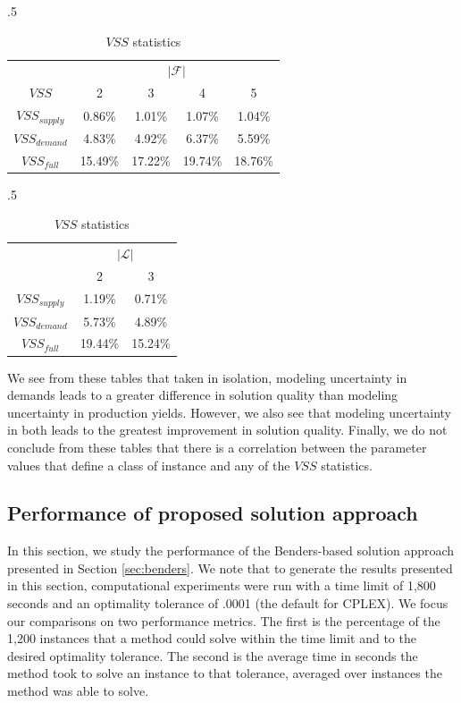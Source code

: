\documentclass[12pt]{article}
\theoremstyle{thmstylethree}%
\begin{document}
\begin{table}[htp]
\begin{subtable}[c]{.5\textwidth}
\small
\centering
\begin{tabular}{|c|c|c|c|c|}
\hline
& \multicolumn{4}{c|}{$\vert \mathcal{F} \vert$}  \\
$VSS$ & 2 & 3 & 4 & 5 \\
\hline
$VSS_{supply}$ & 0.86\% & 1.01\% & 1.07\% & 1.04\% \\
$VSS_{demand}$ & 4.83\% & 4.92\% & 6.37\% & 5.59\% \\
$VSS_{full}$ & 15.49\% & 17.22\% & 19.74\% & 18.76\% \\
\hline
\end{tabular}
\label{tbl:vss_facilities}
\end{subtable}
\begin{subtable}[c]{.5\textwidth}
\center
\small
\begin{tabular}{|c|c|c|}
\hline
& \multicolumn{2}{c|}{$\vert \mathcal{L} \vert$}  \\
 & 2 & 3 \\
 \hline
$VSS_{supply}$ & 1.19\% & 0.71\% \\
$VSS_{demand}$ & 5.73\% & 4.89\% \\
$VSS_{full}$ & 19.44\% & 15.24\% \\
\hline
\end{tabular}
\label{tbl:vss_levels}
\end{subtable}
\caption{$VSS$ statistics}
\end{table}
We see from these tables that taken in isolation, modeling uncertainty in demands leads to a greater difference in solution quality than modeling uncertainty in production yields. However, we also see that modeling uncertainty in both leads to the greatest improvement in solution quality. Finally, we do not conclude from these tables that there is a correlation between the parameter values that define a class of instance and any of the $VSS$ statistics.

\subsection{Performance of proposed solution approach}
\label{subsec:perf_benders}
\noindent
In this section, we study the performance of the Benders-based solution approach presented in Section \ref{sec:benders}. We note that to generate the results presented in this section, computational experiments were run with a time limit of 1,800 seconds and an optimality tolerance of .0001 (the default for CPLEX). We focus our comparisons on two performance metrics. The first is the percentage of the 1,200 instances that a method could solve within the time limit and to the desired optimality tolerance. The second is the average time in seconds the method took to solve an instance to that tolerance, averaged over instances the method was able to solve.
\end{document}
